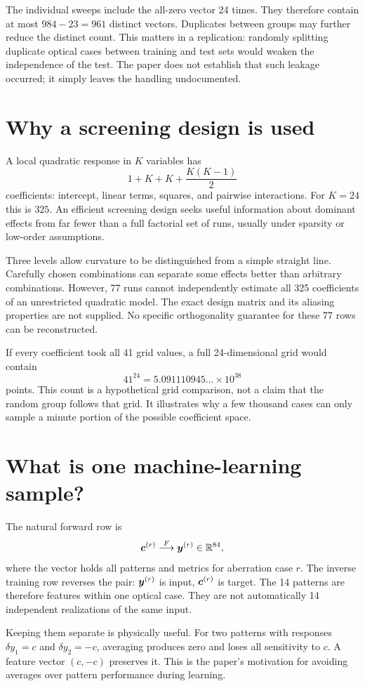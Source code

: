 The individual sweeps include the all-zero vector 24 times.
They therefore contain at most $984-23=961$ distinct vectors.
Duplicates between groups may further reduce the distinct count.
This matters in a replication: randomly splitting duplicate optical
cases between training and test sets would weaken the independence
of the test. The paper does not establish that such leakage occurred;
it simply leaves the handling undocumented.

\section{Why a screening design is used}
A local quadratic response in $K$ variables has
\[
1+K+K+\frac{K(K-1)}2
\]
coefficients: intercept, linear terms, squares, and pairwise interactions.
For $K=24$ this is $325$.
An efficient screening design seeks useful information about dominant
effects from far fewer than a full factorial set of runs, usually under
sparsity or low-order assumptions.

Three levels allow curvature to be distinguished from a simple straight
line. Carefully chosen combinations can separate some effects better
than arbitrary combinations. However, 77 runs cannot independently
estimate all 325 coefficients of an unrestricted quadratic model.
The exact design matrix and its aliasing properties are not supplied.
No specific orthogonality guarantee for these 77 rows can be reconstructed.

If every coefficient took all 41 grid values, a full 24-dimensional
grid would contain
\[
41^{24}=5.091110945\ldots\times10^{38}
\]
points. This count is a hypothetical grid comparison, not a claim that
the random group follows that grid. It illustrates why a few thousand
cases can only sample a minute portion of the possible coefficient space.

\section{What is one machine-learning sample?}
The natural forward row is
\[
\bm{c}^{(r)}
\stackrel{F}{\longrightarrow}
\bm{y}^{(r)}\in\mathbb{R}^{84},
\]
where the vector holds all patterns and metrics for aberration case $r$.
The inverse training row reverses the pair:
$\bm{y}^{(r)}$ is input, $\bm{c}^{(r)}$ is target.
The 14 patterns are therefore features within one optical case.
They are not automatically 14 independent realizations of the same input.

Keeping them separate is physically useful. For two patterns with
responses $\delta y_1=c$ and $\delta y_2=-c$, averaging produces zero
and loses all sensitivity to $c$. A feature vector $(c,-c)$ preserves it.
This is the paper's motivation for avoiding averages over pattern
performance during learning.

